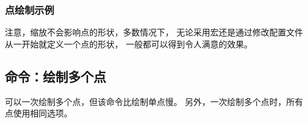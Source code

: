 \documentclass[../main.tex]{subfiles}
\begin{document}
\subsubsection{点绘制示例}

注意，缩放不会影响点的形状，多数情况下，
无论采用宏还是通过修改配置文件从一开始就定义一个点的形状，
一般都可以得到令人满意的效果。

\begin{tkzexample}[latex=5cm,small]
\end{tkzexample}

\vfill

\subsection{命令：绘制多个点}
可以一次绘制多个点，但该命令比绘制单点慢。
另外，一次绘制多个点时，所有点使用相同选项。

\newpage
\end{document}

